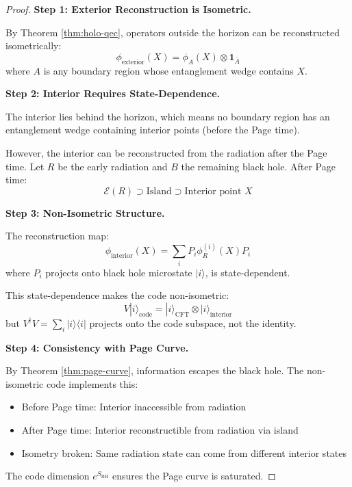 \documentclass[12pt,a4paper]{article}
\begin{document}
\begin{proof}
\textbf{Step 1: Exterior Reconstruction is Isometric.}

By Theorem \ref{thm:holo-qec}, operators outside the horizon can be reconstructed isometrically:
\begin{equation}
\phi_{\text{exterior}}(X) = \phi_A(X) \otimes \mathbf{1}_{\bar{A}}
\end{equation}
where $A$ is any boundary region whose entanglement wedge contains $X$.

\textbf{Step 2: Interior Requires State-Dependence.}

The interior lies behind the horizon, which means no boundary region has an entanglement wedge containing interior points (before the Page time).

However, the interior can be reconstructed from the radiation after the Page time. Let $R$ be the early radiation and $B$ the remaining black hole. After Page time:
\begin{equation}
\mathcal{E}(R) \supset \text{Island} \supset \text{Interior point } X
\end{equation}

\textbf{Step 3: Non-Isometric Structure.}

The reconstruction map:
\begin{equation}
\phi_{\text{interior}}(X) = \sum_i P_i \phi_R^{(i)}(X) P_i
\end{equation}
where $P_i$ projects onto black hole microstate $|i\rangle$, is state-dependent.

This state-dependence makes the code non-isometric:
\begin{equation}
V|i\rangle_{\text{code}} = |i\rangle_{\text{CFT}} \otimes |i\rangle_{\text{interior}}
\end{equation}
but $V^\dagger V = \sum_i |i\rangle\langle i|$ projects onto the code subspace, not the identity.

\textbf{Step 4: Consistency with Page Curve.}

By Theorem \ref{thm:page-curve}, information escapes the black hole. The non-isometric code implements this:
\begin{itemize}
    \item Before Page time: Interior inaccessible from radiation
    \item After Page time: Interior reconstructible from radiation via island
    \item Isometry broken: Same radiation state can come from different interior states
\end{itemize}

The code dimension $e^{S_{\text{BH}}}$ ensures the Page curve is saturated.
\end{proof}
\end{document}
